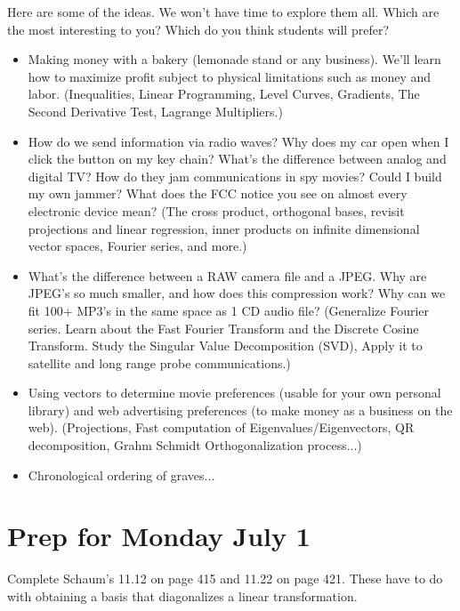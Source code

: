 \documentclass[letterpaper,oneside]{book}%
\theoremstyle{plain}
\theoremstyle{box}
\theoremstyle{problem}
\newtheorem*{hwenum*}{Home Work Practice}
\newenvironment{hw*}[1][]{\begin{hwenum*}[#1]}{\end{hwenum*}\nopagebreak\hrule\bigskip}
\begin{document}
Here are some of the ideas.  We won't have time to explore them all.  Which are the most interesting to you?  Which do you think students will prefer?
\begin{itemize}
 \item Making money with a bakery (lemonade stand or any business). We'll learn how to maximize profit subject to physical limitations such as money and labor. (Inequalities, Linear Programming, Level Curves, Gradients, The Second Derivative Test, Lagrange Multipliers.)
 \item How do we send information via radio waves? Why does my car open when I click the button on my key chain? What's the difference between analog and digital TV? How do they jam communications in spy movies? Could I build my own jammer? What does the FCC notice you see on almost every electronic device mean? (The cross product, orthogonal bases, revisit projections and linear regression, inner products on infinite dimensional vector spaces, Fourier series, and more.)
 \item What's the difference between a RAW camera file and a JPEG.  Why are JPEG's so much smaller, and how does this compression work? Why can we fit 100+ MP3's in the same space as 1 CD audio file?  (Generalize Fourier series.  Learn about the Fast Fourier Transform and the Discrete Cosine Transform. Study the Singular Value Decomposition (SVD), Apply it to satellite and long range probe communications.)
 \item Using vectors to determine movie preferences (usable for your own personal library) and web advertising preferences (to make money as a business on the web). (Projections, Fast computation of Eigenvalues/Eigenvectors, QR decomposition, Grahm Schmidt Orthogonalization process...) 
 \item Chronological ordering of graves...
\end{itemize}



\section{Prep for Monday July 1}

\begin{hw*}
 Complete Schaum's 11.12 on page 415 and 11.22 on page 421. These have to do with obtaining a basis that diagonalizes a linear transformation.   
\end{hw*}
\end{document}
